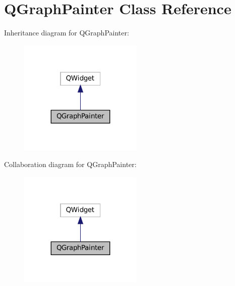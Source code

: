 \hypertarget{classQGraphPainter}{}\section{Q\+Graph\+Painter Class Reference}
\label{classQGraphPainter}


Inheritance diagram for Q\+Graph\+Painter\+:
\nopagebreak
\begin{figure}[H]
\begin{center}
\leavevmode
\includegraphics[width=167pt]{classQGraphPainter__inherit__graph}
\end{center}
\end{figure}


Collaboration diagram for Q\+Graph\+Painter\+:
\nopagebreak
\begin{figure}[H]
\begin{center}
\leavevmode
\includegraphics[width=167pt]{classQGraphPainter__coll__graph}
\end{center}
\end{figure}
